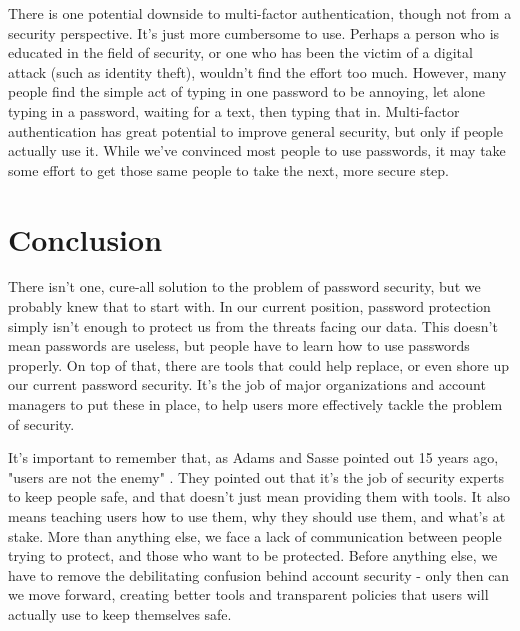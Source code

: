 \documentclass[jou]{apa6}
\begin{document}
There is one potential downside to multi-factor authentication, though not from a security perspective. It's just more cumbersome to use. Perhaps a person who is educated in the field of security, or one who has been the victim of a digital attack (such as identity theft), wouldn't find the effort too much. However, many people find the simple act of typing in one password to be annoying, let alone typing in a password, waiting for a text, then typing that in. Multi-factor authentication has great potential to improve general security, but only if people actually use it. While we've convinced most people to use passwords, it may take some effort to get those same people to take the next, more secure step.

\section{Conclusion}
There isn't one, cure-all solution to the problem of password security, but we probably knew that to start with. In our current position, password protection simply isn't enough to protect us from the threats facing our data. This doesn't mean passwords are useless, but people have to learn how to use passwords properly. On top of that, there are tools that could help replace, or even shore up our current password security. It's the job of major organizations and account managers to put these in place, to help users more effectively tackle the problem of security.

It's important to remember that, as Adams and Sasse pointed out 15 years ago, "users are not the enemy" \parencite{adams99}. They pointed out that it's the job of security experts to keep people safe, and that doesn't just mean providing them with tools. It also means teaching users how to use them, why they should use them, and what's at stake. More than anything else, we face a lack of communication between people trying to protect, and those who want to be protected. Before anything else, we have to remove the debilitating confusion behind account security - only then can we move forward, creating better tools and transparent policies that users will actually use to keep themselves safe.

\clearpage
\printbibliography
\end{document}
